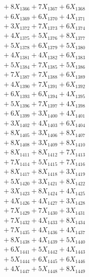 \documentclass[a4paper,10pt]{article}
\begin{document}
{\begin{align}
&\;  + 8 X_{1366} + 7 X_{1367} + 6 X_{1368} \\[0.3ex]
&\;  + 6 X_{1369} + 6 X_{1370} + 4 X_{1371} \\[0.3ex]
&\;  + 3 X_{1372} + 7 X_{1373} + 6 X_{1374} \\[0.3ex]
&\;  + 4 X_{1375} + 5 X_{1376} + 8 X_{1377} \\[0.3ex]
&\;  + 5 X_{1378} + 6 X_{1379} + 5 X_{1380} \\[0.3ex]
&\;  + 4 X_{1381} + 4 X_{1382} + 6 X_{1383} \\[0.3ex]
&\;  + 5 X_{1384} + 7 X_{1385} + 5 X_{1386} \\[0.3ex]
&\;  + 7 X_{1387} + 7 X_{1388} + 6 X_{1389} \\[0.5ex]\allowbreak
&\;  + 4 X_{1390} + 7 X_{1391} + 6 X_{1392} \\[0.3ex]
&\;  + 6 X_{1393} + 6 X_{1394} + 4 X_{1395} \\[0.3ex]
&\;  + 5 X_{1396} + 7 X_{1397} + 4 X_{1398} \\[0.3ex]
&\;  + 6 X_{1399} + 3 X_{1400} + 4 X_{1401} \\[0.3ex]
&\;  + 3 X_{1402} + 4 X_{1403} + 6 X_{1404} \\[0.3ex]
&\;  + 8 X_{1405} + 3 X_{1406} + 8 X_{1407} \\[0.3ex]
&\;  + 8 X_{1408} + 3 X_{1409} + 8 X_{1410} \\[0.3ex]
&\;  + 8 X_{1411} + 8 X_{1412} + 7 X_{1413} \\[0.3ex]
&\;  + 7 X_{1414} + 5 X_{1415} + 7 X_{1416} \\[0.3ex]
&\;  + 8 X_{1417} + 8 X_{1418} + 3 X_{1419} \\[0.5ex]\allowbreak
&\;  + 5 X_{1420} + 3 X_{1421} + 8 X_{1422} \\[0.3ex]
&\;  + 3 X_{1423} + 8 X_{1424} + 4 X_{1425} \\[0.3ex]
&\;  + 4 X_{1426} + 4 X_{1427} + 3 X_{1428} \\[0.3ex]
&\;  + 7 X_{1429} + 7 X_{1430} + 3 X_{1431} \\[0.3ex]
&\;  + 7 X_{1432} + 4 X_{1433} + 8 X_{1434} \\[0.3ex]
&\;  + 7 X_{1435} + 4 X_{1436} + 4 X_{1437} \\[0.3ex]
&\;  + 8 X_{1438} + 4 X_{1439} + 5 X_{1440} \\[0.3ex]
&\;  + 6 X_{1441} + 5 X_{1442} + 4 X_{1443} \\[0.3ex]
&\;  + 5 X_{1444} + 6 X_{1445} + 6 X_{1446} \\[0.3ex]
&\;  + 4 X_{1447} + 5 X_{1448} + 8 X_{1449} \\[0.5ex]\allowbreak

\end{align}}
\end{document}
